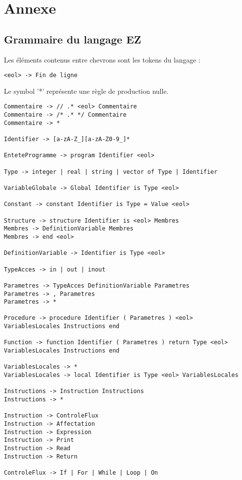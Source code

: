 \section{Annexe}

\subsection{Grammaire du langage EZ}

 Les éléments contenus entre chevrons sont les tokens du langage :
\begin{verbatim}
<eol> -> Fin de ligne
\end{verbatim}

Le symbol '*' représente une règle de production nulle.

\begin{verbatim}
Commentaire -> // .* <eol> Commentaire
Commentaire -> /* .* */ Commentaire
Commentaire -> *

Identifier -> [a-zA-Z_][a-zA-Z0-9_]*

EnteteProgramme -> program Identifier <eol>

Type -> integer | real | string | vector of Type | Identifier

VariableGlobale -> Global Identifier is Type <eol>

Constant -> constant Identifier is Type = Value <eol>

Structure -> structure Identifier is <eol> Membres
Membres -> DefinitionVariable Membres
Membres -> end <eol>

DefinitionVariable -> Identifier is Type <eol>

TypeAcces -> in | out | inout

Parametres -> TypeAcces DefinitionVariable Parametres
Parametres -> , Parametres
Parametres -> *

Procedure -> procedure Identifier ( Parametres ) <eol> VariablesLocales Instructions end

Function -> function Identifier ( Parametres ) return Type <eol> VariablesLocales Instructions end

VariablesLocales -> *
VariablesLocales -> local Identifier is Type <eol> VariablesLocales

Instructions -> Instruction Instructions
Instructions -> *

Instruction -> ControleFlux
Instruction -> Affectation
Instruction -> Expression
Instruction -> Print
Instruction -> Read
Instruction -> Return

ControleFlux -> If | For | While | Loop | On


\end{verbatim}
